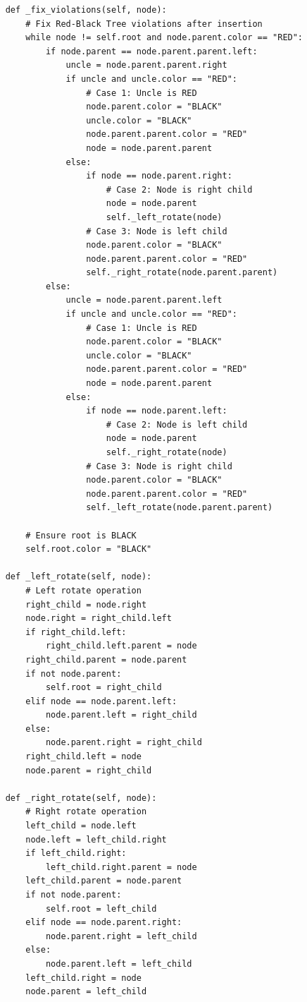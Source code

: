 \documentclass[12pt]{book} %
\begin{document}
\begin{lstlisting}
    def _fix_violations(self, node):
        # Fix Red-Black Tree violations after insertion
        while node != self.root and node.parent.color == "RED":
            if node.parent == node.parent.parent.left:
                uncle = node.parent.parent.right
                if uncle and uncle.color == "RED":
                    # Case 1: Uncle is RED
                    node.parent.color = "BLACK"
                    uncle.color = "BLACK"
                    node.parent.parent.color = "RED"
                    node = node.parent.parent
                else:
                    if node == node.parent.right:
                        # Case 2: Node is right child
                        node = node.parent
                        self._left_rotate(node)
                    # Case 3: Node is left child
                    node.parent.color = "BLACK"
                    node.parent.parent.color = "RED"
                    self._right_rotate(node.parent.parent)
            else:
                uncle = node.parent.parent.left
                if uncle and uncle.color == "RED":
                    # Case 1: Uncle is RED
                    node.parent.color = "BLACK"
                    uncle.color = "BLACK"
                    node.parent.parent.color = "RED"
                    node = node.parent.parent
                else:
                    if node == node.parent.left:
                        # Case 2: Node is left child
                        node = node.parent
                        self._right_rotate(node)
                    # Case 3: Node is right child
                    node.parent.color = "BLACK"
                    node.parent.parent.color = "RED"
                    self._left_rotate(node.parent.parent)

        # Ensure root is BLACK
        self.root.color = "BLACK"

    def _left_rotate(self, node):
        # Left rotate operation
        right_child = node.right
        node.right = right_child.left
        if right_child.left:
            right_child.left.parent = node
        right_child.parent = node.parent
        if not node.parent:
            self.root = right_child
        elif node == node.parent.left:
            node.parent.left = right_child
        else:
            node.parent.right = right_child
        right_child.left = node
        node.parent = right_child

    def _right_rotate(self, node):
        # Right rotate operation
        left_child = node.left
        node.left = left_child.right
        if left_child.right:
            left_child.right.parent = node
        left_child.parent = node.parent
        if not node.parent:
            self.root = left_child
        elif node == node.parent.right:
            node.parent.right = left_child
        else:
            node.parent.left = left_child
        left_child.right = node
        node.parent = left_child
\end{lstlisting}
\end{document}
